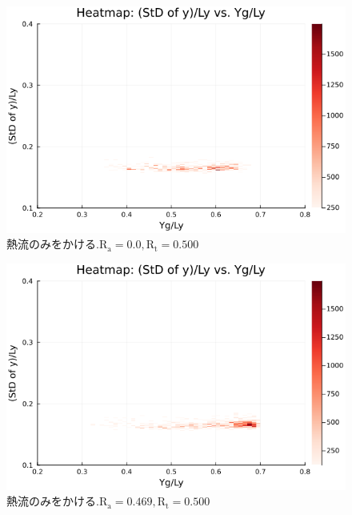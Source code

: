 \begin{figure}[H]
  \centering
  \includegraphics[scale=0.6]{image/g0_heat/2024-01-15T14:07:35.928_mapg0_chiinf_Ay50_rho0.4_T0.43_dT0.04_Rd0.0_Rt0.5_Ra0.0_g0_run4.0e7.png}
  \caption{$熱流のみをかける. \text{R}_\text{a}=0.0,\text{R}_\text{t}=0.500$}
  \label{}
\end{figure}

\begin{figure}[H]
  \centering
  \includegraphics[scale=0.6]{image/g0_heat/2024-01-15T14:07:36.002_mapg0_chiinf_Ay50_rho0.4_T0.43_dT0.04_Rd0.0_Rt0.5_Ra0.4693845_g0_run4.0e7.png}
  \caption{$熱流のみをかける. \text{R}_\text{a}=0.469,\text{R}_\text{t}=0.500$}
  \label{}
\end{figure}

